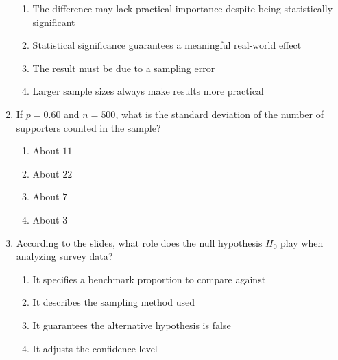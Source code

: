 \documentclass{article}
\begin{document}
\begin{enumerate}
  \begin{enumerate}[label=(\Alph*)]
  \item The difference may lack practical importance despite being statistically significant
  \item Statistical significance guarantees a meaningful real-world effect
  \item The result must be due to a sampling error
  \item Larger sample sizes always make results more practical
  \end{enumerate}
\item If $p=0.60$ and $n=500$, what is the standard deviation of the number of supporters counted in the sample?
  \begin{enumerate}[label=(\Alph*)]
  \item About $11$
  \item About $22$
  \item About $7$
  \item About $3$
  \end{enumerate}
\item According to the slides, what role does the null hypothesis $H_0$ play when analyzing survey data?
  \begin{enumerate}[label=(\Alph*)]
  \item It specifies a benchmark proportion to compare against
  \item It describes the sampling method used
  \item It guarantees the alternative hypothesis is false
  \item It adjusts the confidence level
  \end{enumerate}
\end{enumerate}
\end{document}
